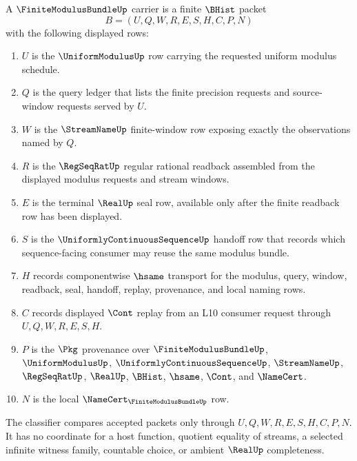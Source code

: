\begin{definition}
\label{def:finite-modulus-bundle-carrier}
A $\FiniteModulusBundleUp$ carrier is a finite $\BHist$ packet
$$
B=(U,Q,W,R,E,S,H,C,P,N)
$$
with the following displayed rows:
\begin{enumerate}
\item $U$ is the $\UniformModulusUp$ row carrying the requested uniform modulus schedule.
\item $Q$ is the query ledger that lists the finite precision requests and source-window requests served by $U$.
\item $W$ is the $\StreamNameUp$ finite-window row exposing exactly the observations named by $Q$.
\item $R$ is the $\RegSeqRatUp$ regular rational readback assembled from the displayed modulus requests and stream windows.
\item $E$ is the terminal $\RealUp$ seal row, available only after the finite readback row has been displayed.
\item $S$ is the $\UniformlyContinuousSequenceUp$ handoff row that records which sequence-facing consumer may reuse the same modulus bundle.
\item $H$ records componentwise $\hsame$ transport for the modulus, query, window, readback, seal, handoff, replay, provenance, and local naming rows.
\item $C$ records displayed $\Cont$ replay from an L10 consumer request through $U,Q,W,R,E,S,H$.
\item $P$ is the $\Pkg$ provenance over $\FiniteModulusBundleUp$, $\UniformModulusUp$, $\UniformlyContinuousSequenceUp$, $\StreamNameUp$, $\RegSeqRatUp$, $\RealUp$, $\BHist$, $\hsame$, $\Cont$, and $\NameCert$.
\item $N$ is the local $\NameCert_{\FiniteModulusBundleUp}$ row.
\end{enumerate}
The classifier compares accepted packets only through $U,Q,W,R,E,S,H,C,P,N$. It has no coordinate for a host function, quotient equality of streams, a selected infinite witness family, countable choice, or ambient $\RealUp$ completeness.
\end{definition}

